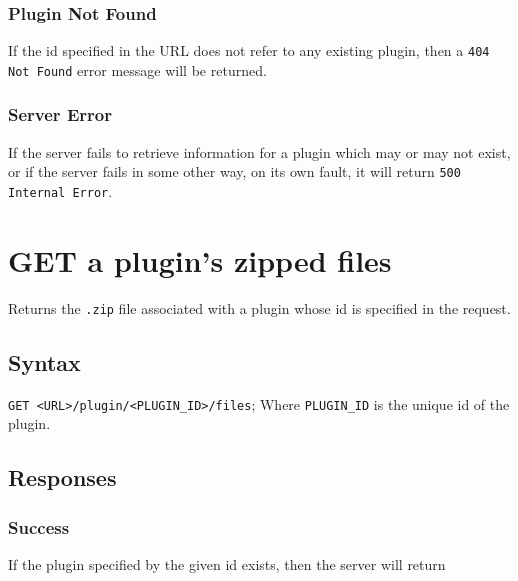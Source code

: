 \documentclass[a4paper, 12pt]{article}
\begin{document}
				

			\subsubsection{Plugin Not Found}
				If the id specified in the URL does not refer to any existing plugin, then a \verb|404 Not Found| error message will be returned.

			\subsubsection{Server Error}
				If the server fails to retrieve information for a plugin which may or may not exist, or if the server fails in some other way, on its own fault, it will return \verb|500 Internal Error|.

	\section{GET a plugin's zipped files}
		Returns the \verb|.zip| file associated with a plugin whose id is specified in the request.

		\subsection{Syntax}
			\verb|GET <URL>/plugin/<PLUGIN_ID>/files|; \footnotesize{Where \verb|PLUGIN_ID| is the unique id of the plugin.}

		\subsection{Responses}
			\subsubsection{Success}
				If the plugin specified by the given id exists, then the server will return 
\end{document}
